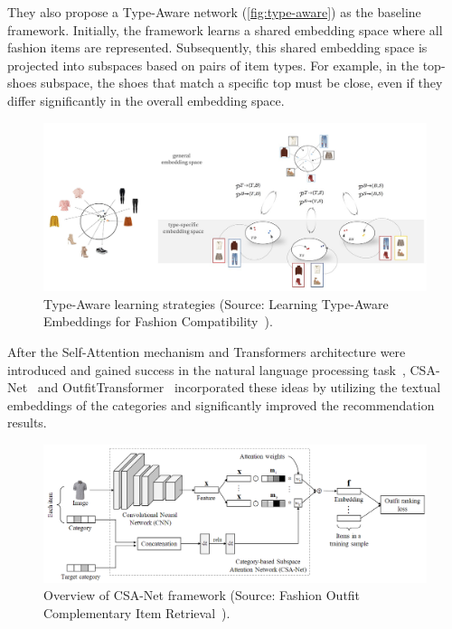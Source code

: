 They also propose a Type-Aware network (\autoref{fig:type-aware}) as the baseline framework. 
Initially, the framework learns a shared embedding space where all fashion items are represented. Subsequently, this shared embedding space is projected into subspaces based on pairs of item types. For example, in the top-shoes subspace, the shoes that match a specific top must be close, even if they differ significantly in the overall embedding space.

\begin{figure}[h!]
    \centering
    \includegraphics[width=\linewidth]{content/resources/images/literature-review/TypeAware.PNG}
    \caption{Type-Aware learning strategies (Source: Learning Type-Aware Embeddings for Fashion
Compatibility~\cite{Mariya-ECCV18-Learning}).}
    \label{fig:type-aware}
\end{figure}

After the Self-Attention mechanism and Transformers architecture \cite{Vaswani-NeurIPS2017-Attention} were introduced and gained success in the natural language processing task~\cite{Devlin-ArXiv2018-BERT}, CSA-Net~\cite{Lin-CVPR2020-Fashion} and OutfitTransformer~\cite{Sarkar-CVPRW2022-OutfitTransformer} incorporated these ideas by utilizing the textual embeddings of the categories and significantly improved the recommendation results. 

\begin{figure}[h!]
    \centering
    \includegraphics[width=\linewidth]{content/resources/images/literature-review/CSA.PNG}
    \caption{Overview of CSA-Net framework (Source: Fashion Outfit Complementary Item Retrieval~\cite{Lin-CVPR2020-Fashion}).}
    \label{fig:csa}
\end{figure}

